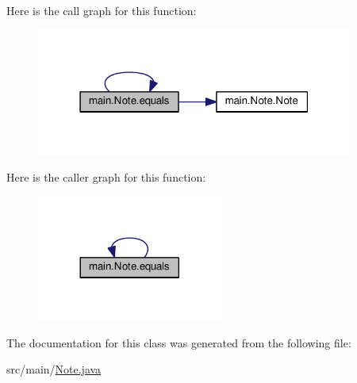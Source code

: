 Here is the call graph for this function\+:
\nopagebreak
\begin{figure}[H]
\begin{center}
\leavevmode
\includegraphics[width=295pt]{classmain_1_1_note_a69dc307885a29732803e37e20418e13c_cgraph}
\end{center}
\end{figure}




Here is the caller graph for this function\+:
\nopagebreak
\begin{figure}[H]
\begin{center}
\leavevmode
\includegraphics[width=173pt]{classmain_1_1_note_a69dc307885a29732803e37e20418e13c_icgraph}
\end{center}
\end{figure}




The documentation for this class was generated from the following file\+:\begin{DoxyCompactItemize}
\item 
src/main/\hyperlink{_note_8java}{Note.\+java}\end{DoxyCompactItemize}

